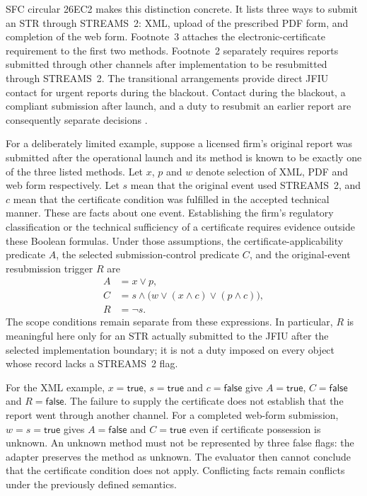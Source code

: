 \documentclass[12pt,a4paper,oneside,openany]{book}
\begin{document}
SFC circular 26EC2 makes this distinction concrete. It lists three ways to
submit an STR through STREAMS~2: XML, upload of the prescribed PDF form, and
completion of the web form. Footnote~3 attaches the electronic-certificate
requirement to the first two methods. Footnote~2 separately requires reports
submitted through other channels after implementation to be resubmitted through
STREAMS~2. The transitional arrangements provide direct JFIU contact for urgent
reports during the blackout. Contact during the blackout, a compliant submission
after launch, and a duty to resubmit an earlier report are consequently separate
decisions \citep{sfcstr2026}.

For a deliberately limited example, suppose a licensed firm's original report
was submitted after the operational launch and its method is known to be exactly
one of the three listed methods. Let $x$, $p$ and $w$ denote selection of XML,
PDF and web form respectively. Let $s$ mean that the original event used
STREAMS~2, and $c$ mean that the certificate condition was fulfilled in the
accepted technical manner. These are facts about one event. Establishing the
firm's regulatory classification or the technical sufficiency of a certificate
requires evidence outside these Boolean formulas. Under those assumptions, the
certificate-applicability predicate $A$, the selected submission-control
predicate $C$, and the original-event resubmission trigger $R$ are
\begin{align}
 A &= x \lor p,\label{eq:str-certificate-applicability}\\
 C &= s \land \bigl(w \lor (x\land c) \lor (p\land c)\bigr),\label{eq:str-selected-submission}\\
 R &= \neg s.\label{eq:str-resubmission-trigger}
\end{align}
The scope conditions remain separate from these expressions. In particular,
$R$ is meaningful here only for an STR actually submitted to the JFIU after the
selected implementation boundary; it is not a duty imposed on every object
whose record lacks a STREAMS~2 flag.

For the XML example, $x=\mathsf{true}$, $s=\mathsf{true}$ and
$c=\mathsf{false}$ give $A=\mathsf{true}$, $C=\mathsf{false}$ and
$R=\mathsf{false}$. The failure to supply the certificate does not establish
that the report went through another channel. For a completed web-form
submission, $w=s=\mathsf{true}$ gives $A=\mathsf{false}$ and
$C=\mathsf{true}$ even if certificate possession is unknown. An unknown method
must not be represented by three false flags: the adapter preserves the method
as unknown. The evaluator then cannot conclude that the certificate condition
does not apply. Conflicting facts remain conflicts under the previously defined
semantics.
\end{document}
